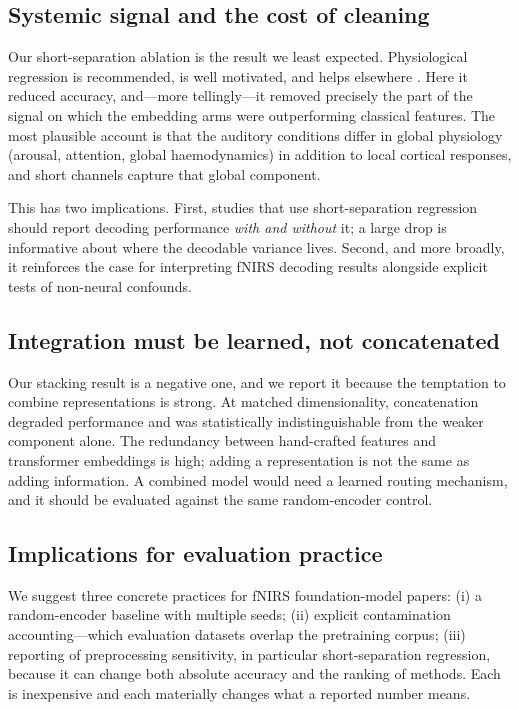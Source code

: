 \subsection{Systemic signal and the cost of cleaning}
Our short-separation ablation is the result we least expected. Physiological regression is
recommended, is well motivated, and helps elsewhere \citep{fischer2026density}. Here it reduced
accuracy, and---more tellingly---it removed precisely the part of the signal on which the
embedding arms were outperforming classical features. The most plausible account is that the
auditory conditions differ in global physiology (arousal, attention, global haemodynamics) in
addition to local cortical responses, and short channels capture that global component.

This has two implications. First, studies that use short-separation regression should report
decoding performance \emph{with and without} it; a large drop is informative about where the
decodable variance lives. Second, and more broadly, it reinforces the case for interpreting
fNIRS decoding results alongside explicit tests of non-neural confounds.

\subsection{Integration must be learned, not concatenated}
Our stacking result is a negative one, and we report it because the temptation to combine
representations is strong. At matched dimensionality, concatenation degraded performance and was
statistically indistinguishable from the weaker component alone. The redundancy between
hand-crafted features and transformer embeddings is high; adding a representation is not the same
as adding information. A combined model would need a learned routing mechanism, and it should be
evaluated against the same random-encoder control.

\subsection{Implications for evaluation practice}
We suggest three concrete practices for fNIRS foundation-model papers: (i) a random-encoder
baseline with multiple seeds; (ii) explicit contamination accounting---which evaluation datasets
overlap the pretraining corpus; (iii) reporting of preprocessing sensitivity, in particular
short-separation regression, because it can change both absolute accuracy and the ranking of
methods. Each is inexpensive and each materially changes what a reported number means.
